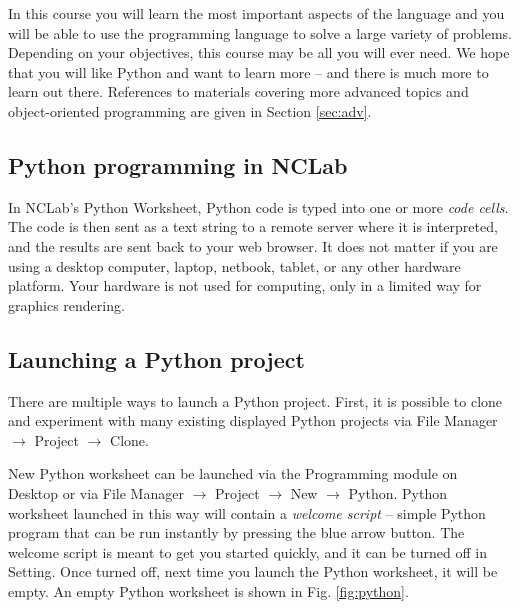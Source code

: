 \documentclass[article,A4,12pt]{llncs}
\begin{document}
In this course you will 
learn the most important aspects of the language and you will be able to 
use the programming language to solve a large variety of problems. 
Depending on your objectives, this course may be all you will ever need. 
We hope that you will like Python and want to learn more -- and there is much 
more to learn out there. References to materials covering more advanced topics 
and object-oriented programming are given in Section \ref{sec:adv}.

\subsection{Python programming in NCLab}

In NCLab's Python Worksheet, Python code is typed into one or more {\em code cells}. 
The code is then sent as a text string to a remote server where it is interpreted, and the 
results are sent back to your web browser. It does not matter if you are using a desktop 
computer, laptop, netbook, tablet, or any other hardware platform. Your hardware
is not used for computing, only in a limited way for graphics rendering.


\subsection{Launching a Python project}


There are multiple ways to launch a Python project. First, it is 
possible to clone and experiment with many existing displayed Python 
projects via File Manager $\rightarrow$ 
Project $\rightarrow$ Clone. 

New Python worksheet can be launched via 
the Programming module on Desktop or via File Manager $\rightarrow$ 
Project $\rightarrow$ New $\rightarrow$ Python. Python worksheet
launched in this way will contain a {\em welcome script} -- simple Python 
program that can be run instantly by pressing the blue arrow button. 
The welcome script is meant to get you started quickly, and it can 
be turned off in Setting. Once turned off, next time you launch the 
Python worksheet, it will be empty. An empty Python worksheet
is shown in Fig. \ref{fig:python}.
\end{document}
